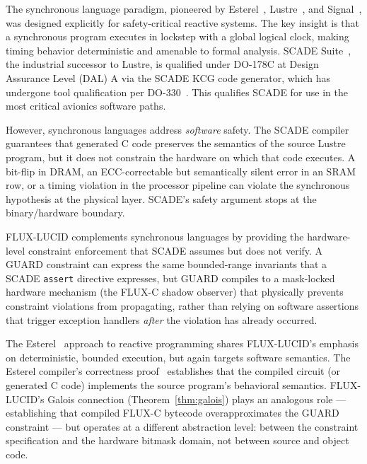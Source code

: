 \documentclass[conference]{IEEEtran}
\begin{document}
The synchronous language paradigm, pioneered by Esterel~\cite{berry1992esterel},
Lustre~\cite{halbwachs1991lustre}, and Signal~\cite{benveniste1991signal},
was designed explicitly for safety-critical reactive systems. The key insight
is that a synchronous program executes in lockstep with a global logical
clock, making timing behavior deterministic and amenable to formal analysis.
SCADE Suite~\cite{scade}, the industrial successor to Lustre, is qualified
under DO-178C at Design Assurance Level (DAL) A via the SCADE KCG code
generator, which has undergone tool qualification per DO-330~\cite{do330}.
This qualifies SCADE for use in the most critical avionics software paths.

However, synchronous languages address \emph{software} safety.
The SCADE compiler guarantees that generated C code preserves the semantics
of the source Lustre program, but it does not constrain the hardware on
which that code executes. A bit-flip in DRAM, an ECC-correctable but
semantically silent error in an SRAM row, or a timing violation in the
processor pipeline can violate the synchronous hypothesis at the physical
layer. SCADE's safety argument stops at the binary/hardware boundary.

FLUX-LUCID complements synchronous languages by providing the hardware-level
constraint enforcement that SCADE assumes but does not verify. A GUARD
constraint can express the same bounded-range invariants that a SCADE
\texttt{assert} directive expresses, but GUARD compiles to a mask-locked
hardware mechanism (the FLUX-C shadow observer) that physically prevents
constraint violations from propagating, rather than relying on software
assertions that trigger exception handlers \emph{after} the violation has
already occurred.

The Esterel~\cite{berry1999esterel_semantics} approach to reactive
programming shares FLUX-LUCID's emphasis on deterministic, bounded execution,
but again targets software semantics. The Esterel compiler's correctness
proof~\cite{berry1992esterel} establishes that the compiled circuit
(or generated C code) implements the source program's behavioral semantics.
FLUX-LUCID's Galois connection (Theorem~\ref{thm:galois}) plays an analogous
role — establishing that compiled FLUX-C bytecode overapproximates the GUARD
constraint — but operates at a different abstraction level: between the
constraint specification and the hardware bitmask domain, not between
source and object code.

\end{document}
